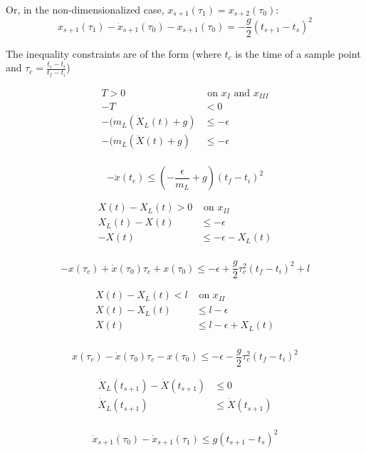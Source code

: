 \documentclass[11pt]{article}
\begin{document}
Or, in the non-dimensionalized case, $x_{s+1}(\tau_1) = x_{s+2}(\tau_0)$:
\[
\boxed{
x_{s+1}(\tau_1) - \dot{x}_{s+1}(\tau_0) - x_{s+1}(\tau_0)  = -\frac{g}{2} (t_{s+1}-t_s)^2
}
\]


\newpage
The inequality constraints are of the form (where $t_c$ is the time of a sample point and $\tau_c = \frac{t_c - t_i}{t_f-t_i}$)

\begin{align*}
T > 0 & \text{ on } x_I \text{ and } x_{III} \\
-T &< 0 \\
-(m_L (\ddot{X}_L(t)+g) &\le -\epsilon \\
-(m_L (\ddot{X}(t)+g) &\le -\epsilon \\
\end{align*}

\[
\boxed{
-\ddot{x}(t_c) \le  (-\frac{ \epsilon }{m_L} + g ) (t_f-t_i)^2 
}
\]

\begin{align*}
 X(t) - X_L(t) > 0 & \text{ on } x_{II} \\
 X_L(t) -X(t) &\le - \epsilon \\
 - X(t) & \le - \epsilon -  X_L(t) \\
\end{align*}

\[
\boxed{
- x(\tau_c) +  \dot{x} (\tau_0) \tau_c +  x(\tau_0) \le - \epsilon + \frac{g}{2} \tau_c^2 (t_f-t_i)^2 + l
}
\]

\begin{align*}
  X(t) - X_L(t) < l  & \text{ on } x_{II} \\
 X(t) - X_L(t) &\le l - \epsilon \\
  X(t) & \le l - \epsilon +  X_L(t) \\
\end{align*}

\[
\boxed{
x(\tau_c) -  \dot{x} (\tau_0) \tau_c -  x(\tau_0) \le - \epsilon -\frac{g}{2} \tau_c^2 (t_f-t_i)^2
}
\]

\begin{align*}
   \dot{X}_L(t_{s+1}) - \dot{X}(t_{s+1}) & \le 0 \\
   \dot{X}_L(t_{s+1}) & \le  \dot{X}(t_{s+1})  \\
\end{align*}

\[
\boxed{
\dot{x}_{s+1}(\tau_0) - \dot{x}_{s+1}(\tau_1) \le  g(t_{s+1}-t_s)^2
}
\]
\end{document}
